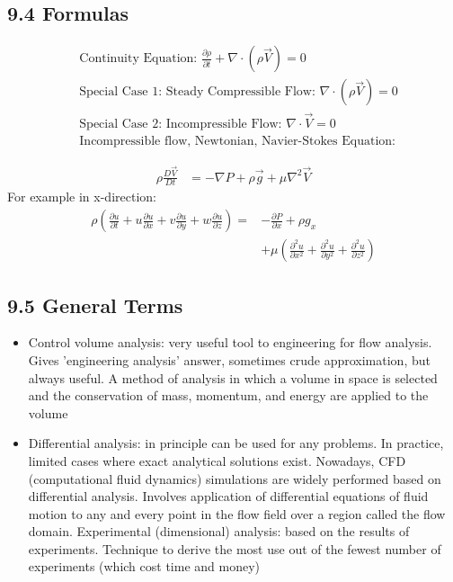 \subsection*{9.4 Formulas}
\begin{fleqn}
\begin{align*}
    &\text{Continuity Equation: } \frac{\partial \rho}{\partial t} + \nabla \cdot (\rho \vec{V}) = 0 \\
    &\text{Special Case 1: Steady Compressible Flow: } \nabla \cdot (\rho \vec{V}) = 0 \\
    &\text{Special Case 2: Incompressible Flow: } \nabla \cdot \vec{V} = 0 \\
    &\text{Incompressible flow, Newtonian, Navier-Stokes Equation:}
\end{align*}
\end{fleqn}
\begin{align*}
    \rho \frac{ D \vec{V}}{D t}  &= -\nabla P + \rho \vec{g} + \mu \nabla^2 \vec{V} 
\end{align*}
For example in x-direction:
\begin{align*}
    \rho \left(\frac{\partial u}{\partial t} + u \frac{\partial u}{\partial x} + v \frac{\partial u}{\partial y} + w \frac{\partial u}{\partial z}\right) 
    = &-\frac{\partial P}{\partial x} + \rho g_x \\
    &+ \mu \left(\frac{\partial^2 u}{\partial x^2} + \frac{\partial^2 u}{\partial y^2} + \frac{\partial^2 u}{\partial z^2}\right)
\end{align*}
\subsection*{9.5 General Terms}
\begin{itemize}
    \item Control volume analysis: very useful tool to engineering for flow analysis. Gives 'engineering analysis' answer, sometimes crude approximation, but always useful.
    A method of analysis in which a volume in space is selected and the conservation of mass, momentum, and energy are applied to the volume
    \item Differential analysis:  in principle can be used for any problems. In practice, limited cases where exact analytical solutions exist. 
    Nowadays, CFD (computational fluid dynamics) simulations are widely performed based on differential analysis. Involves application of differential 
    equations of fluid motion to any and every point in the flow field over a region called the flow domain.
    Experimental (dimensional) analysis: based on the results of experiments. Technique to derive the most use out of the fewest number of experiments 
    (which cost time and money)
\end{itemize}